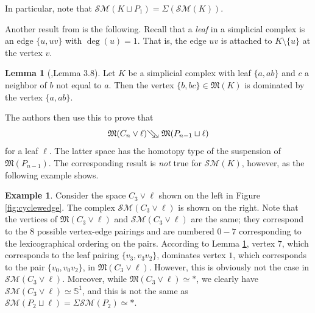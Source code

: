 \documentclass{amsart}
\theoremstyle{definition}
\newtheorem{lemma}[theorem]{Lemma}
\newtheorem{example}[theorem]{Example}
\newcommand{\zs}{{\mathbb S}}
\newcommand{\sm}{{\mathcal{SM}}}
\newcommand\sco{{\searrow \hspace{-6 pt}\searrow\hspace{3 pt}}}
\begin{document}
In particular, note that $\sm(K\sqcup P_1)=\Sigma(\sm(K))$.

Another result from \cite{DonovonLinScoville2023} is the following. Recall that a {\em leaf} in a simplicial complex is an edge $\{u,uv\}$ with $\deg(u)=1$. That is, the edge $uv$ is attached to $K\setminus \{u\}$ at the vertex $v$. 

\begin{lemma}[\cite{DonovonLinScoville2023},Lemma 3.8]\label{wedgelemma}
    Let $K$ be a simplicial complex with leaf $\{a,ab\}$ and $c$ a neighbor of $b$ not equal to $a$. Then the vertex $\{b,bc\}\in{\mathfrak M}(K)$ is dominated by the vertex $\{a,ab\}$.
\end{lemma}

The authors then use this to prove that $${\mathfrak M}(C_n\vee\ell) \sco {\mathfrak M}(P_{n-1}\sqcup\ell)$$ for a leaf $\ell$. The latter space has the homotopy type of the suspension of ${\mathfrak M}(P_{n-1})$. The corresponding result is {\em not} true for $\sm(K)$, however, as the following example shows.

\begin{example}
    Consider the space $C_3\vee \ell$ shown on the left in Figure \ref{fig:cyclewedge}. The complex $\sm(C_3\vee\ell)$ is shown on the right. Note that the vertices of ${\mathfrak M}(C_3\vee\ell)$ and $\sm(C_3\vee\ell)$ are the same; they correspond to the $8$ possible vertex-edge pairings and are numbered $0-7$ corresponding to the lexicographical ordering on the pairs. According to Lemma \ref{wedgelemma}, vertex $7$, which corresponds to the leaf pairing $\{v_3,v_3v_2\}$, dominates vertex $1$, which corresponds to the pair $\{v_0,v_0v_2\}$, in ${\mathfrak M}(C_3\vee\ell)$. However, this is obviously not the case in $\sm(C_3\vee\ell)$. Moreover, while ${\mathfrak M}(C_3\vee\ell)\simeq \ast$, we clearly have $\sm(C_3\vee\ell)\simeq \zs^1$, and this is not the same as $\sm(P_2\sqcup\ell)=\Sigma\sm(P_2)\simeq\ast$.
\end{example}
\end{document}
